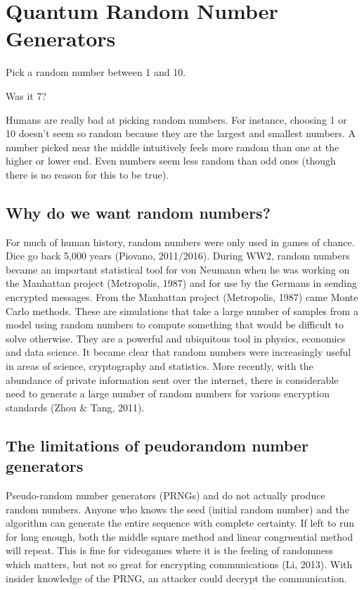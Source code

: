 \documentclass{book}
\begin{document}
\chapter{Quantum Random Number Generators}


Pick a random number between 1 and 10. 

Was it 7?    

Humans are really bad at picking random numbers. For instance, choosing 1 or 10 doesn’t seem so random because they are the largest and smallest numbers. A number picked near the middle intuitively feels more random than one at the higher or lower end. Even numbers seem less random than odd ones (though there is no reason for this to be true). 


\section{Why do we want random numbers?}

For much of human history, random numbers were only used in games of chance. Dice go back 5,000 years (Piovano, 2011/2016). During WW2, random numbers became an important statistical tool for von Neumann when he was working on the Manhattan project (Metropolis, 1987) and for use by the Germans in sending encrypted messages. 
From the Manhattan project (Metropolis, 1987) came Monte Carlo methods. These are simulations that take a large number of samples from a model using random numbers to compute something that would be difficult to solve otherwise. They are a powerful and ubiquitous tool in physics, economics and data science. It became clear that random numbers were increasingly useful in areas of science, cryptography and statistics. More recently, with the abundance of private information sent over the internet, there is considerable need to generate a large number of random numbers for various encryption standards (Zhou \& Tang, 2011).

\section{The limitations of peudorandom number generators} 


Pseudo-random number generators (PRNGs) and do not actually produce random numbers. Anyone who knows the seed (initial random number) and the algorithm can generate the entire sequence with complete certainty. If left to run for long enough, both the middle square method and linear congruential method will repeat. This is fine for videogames where it is the feeling of randomness which matters, but not so great for encrypting communications (Li, 2013). With insider knowledge of the PRNG, an attacker could decrypt the communication.
\end{document}
